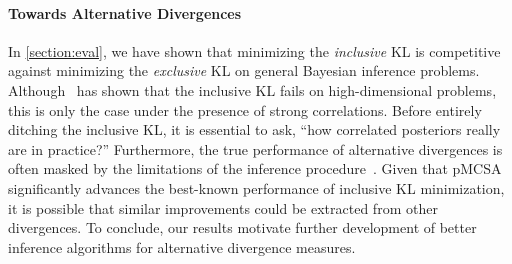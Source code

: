 \paragraph{Towards Alternative Divergences}
In \cref{section:eval}, we have shown that minimizing the \textit{inclusive} KL is competitive against  minimizing the \textit{exclusive} KL on general Bayesian inference problems.
Although~\citet{dhaka_challenges_2021} has shown that the inclusive KL fails on high-dimensional problems, this is only the case under the presence of strong correlations.
Before entirely ditching the inclusive KL, it is essential to ask, ``how correlated posteriors really are in practice?''
Furthermore, the true performance of alternative divergences is often masked by the limitations of the inference procedure~\citep{geffner2021empirical, pmlr-v139-geffner21a}.
Given that pMCSA significantly advances the best-known performance of inclusive KL minimization, it is possible that similar improvements could be extracted from other divergences.
To conclude, our results motivate further development of better inference algorithms for alternative divergence measures.



